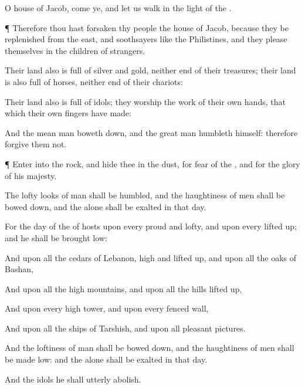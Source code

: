 {O
house of
Jacob,
come ye, and let us
walk in the
light of the
{}.


\par }{\PP {}¶ Therefore thou hast
forsaken thy
people the
house of
Jacob, because they be
replenished from the
east, and
{}
soothsayers like the
Philistines, and they
please themselves in the
children of
strangers.

Their
land also is
full of
silver and
gold, neither
{}
end of their
treasures; their
land is also
full of
horses, neither
{}
end of their
chariots:

Their
land also is
full of
idols; they
worship the
work of their own
hands, that which their own
fingers have
made:

And the mean
man boweth
down, and the great
man
humbleth himself: therefore
forgive them not.


\par }{\PP {}¶
Enter into the
rock, and
hide thee in the
dust,
for
fear of the
{}, and for the
glory of his
majesty.

The
lofty
looks of
man shall be
humbled, and the
haughtiness of
men shall be bowed
down, and the
{} alone shall be
exalted in that
day.

For the
day of the
{} of
hosts
{} upon every
{}
proud and
lofty, and upon every
{} lifted
up; and he shall be brought
low:

And upon all the
cedars of
Lebanon,
{}
high and lifted
up, and upon all the
oaks of
Bashan,

And upon all the
high
mountains, and upon all the
hills
{} lifted
up,

And upon every
high
tower, and upon every
fenced
wall,

And upon all the
ships of
Tarshish, and upon all
pleasant
pictures.

And the
loftiness of
man shall be bowed
down, and the
haughtiness of
men shall be made
low: and the
{} alone shall be
exalted in that
day.

And the
idols he shall
utterly
abolish.

}
